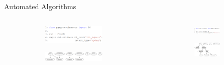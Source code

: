 \documentclass{beamer}
\begin{document}
\begin{frame}{Automated Algorithms}
	\begin{columns}
		\begin{column}{0.5\textwidth}
			\begin{figure}
				\centering
				\begin{subfigure}{\textwidth}
					\includegraphics[scale=0.28]{imgs/pc_chisquare.png}
				\end{subfigure}
				\vspace{1em}
				\begin{subfigure}{\textwidth}
					\includegraphics[scale=0.25]{imgs/adult_x2.png}
				\end{subfigure}
			\end{figure}
		\end{column}
		\vrule
		\begin{column}{0.5\textwidth}
			\begin{figure}
				\centering
				\begin{subfigure}{\textwidth}
					\includegraphics[scale=0.25]{imgs/hill_bic.png}
				\end{subfigure}
				\begin{subfigure}{\textwidth}
					\includegraphics[scale=0.25]{imgs/adult_bic.png}
				\end{subfigure}
			\end{figure}
		\end{column}
	\end{columns}
\end{frame}
\end{document}

